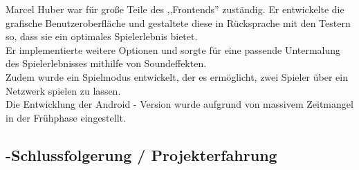 \documentclass[12pt,a4paper]{article}
\begin{document}
	Marcel Huber war für große Teile des ,,Frontends'' zuständig. Er entwickelte die grafische Benutzeroberfläche und gestaltete diese in Rücksprache mit den Testern so, dass sie ein optimales Spielerlebnis bietet. \\[2ex]
Er implementierte weitere Optionen und sorgte für eine passende Untermalung des Spielerlebnisses mithilfe von Soundeffekten.\\
Zudem wurde ein Spielmodus entwickelt, der es ermöglicht, zwei Spieler über ein Netzwerk spielen zu lassen. \\
Die Entwicklung der Android - Version wurde aufgrund von massivem Zeitmangel in der Frühphase eingestellt. 

\newpage
 \subsection{-Schlussfolgerung / Projekterfahrung}
 
\end{document}
